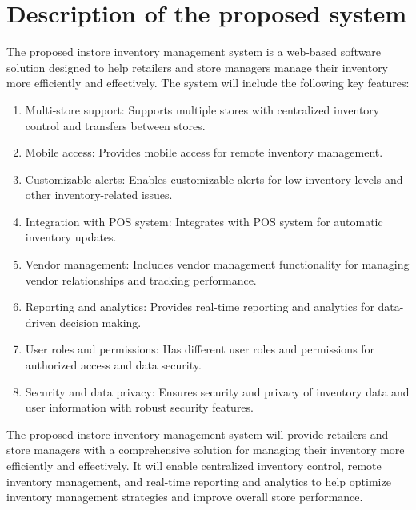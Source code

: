 \section{Description of the proposed system \label{Section::Descriptionoftheproposedsystem}}

The proposed instore inventory management system is a web-based software solution designed to help retailers and store managers manage their inventory more efficiently and effectively. The system will include the following key features:

\begin{enumerate}
    \item Multi-store support: Supports multiple stores with centralized inventory control and transfers between stores.

    \item Mobile access: Provides mobile access for remote inventory management.

    \item Customizable alerts: Enables customizable alerts for low inventory levels and other inventory-related issues.

    \item Integration with POS system: Integrates with POS system for automatic inventory updates.

    \item Vendor management: Includes vendor management functionality for managing vendor relationships and tracking performance.

    \item Reporting and analytics: Provides real-time reporting and analytics for data-driven decision making.

    \item User roles and permissions: Has different user roles and permissions for authorized access and data security.

    \item Security and data privacy: Ensures security and privacy of inventory data and user information with robust security features.
\end{enumerate}
The proposed instore inventory management system will provide retailers and store managers with a comprehensive solution for managing their inventory more efficiently and effectively. It will enable centralized inventory control, remote inventory management, and real-time reporting and analytics to help optimize inventory management strategies and improve overall store performance.

